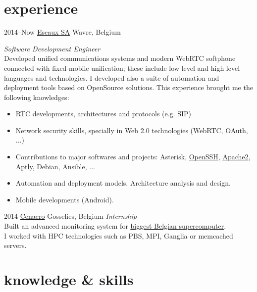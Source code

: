 \documentclass[]{friggeri-cv} %
\begin{document}
\section{experience}

\begin{entrylist}
\entry
{2014--Now}
{\href{http://escaux.com}{\ul{Escaux SA}}}
{Wavre, Belgium}
{\emph{Software Development Engineer} \\
Developed unified communications systems and modern WebRTC softphone connected with fixed-mobile unification; these include low level and high level languages and technologies. I developed also a suite of automation and deployment tools based on OpenSource solutions. This experience brought me the following knowledges:
\begin{itemize}
\item RTC developments, architectures and protocols (e.g. SIP)
\item Network security skills, specially in Web 2.0 technologies (WebRTC, OAuth, ...)
\item Contributions to major softwares and projects: Asterisk, \href{http://lists.mindrot.org/pipermail/openssh-unix-dev/2016-December/035563.html}{\ul{OpenSSH}}, \href{https://github.com/rmedaer/mod_psm}{\ul{Apache2}}, \href{https://github.com/smira/aptly/pull/390}{\ul{Aptly}}, Debian, Ansible, ...
\item Automation and deployment models. Architecture analysis and design.
\item Mobile developments (Android).
\end{itemize}}
\entry
{2014}
{\href{http://www.cenaero.be/}{\ul{Cenaero}}}
{Gosselies, Belgium}
{\emph{Internship} \\
Built an advanced monitoring system for \href{https://www.top500.org/system/178439}{\ul{biggest Belgian supercomputer}}. \\
I worked with HPC technologies such as PBS, MPI, Ganglia or memcached servers.}
\end{entrylist}


\section{knowledge \& skills}
\end{document}

